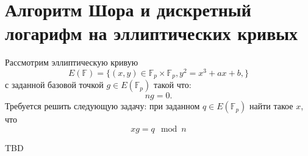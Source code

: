 \section{Алгоритм Шора и дискретный логарифм на эллиптических кривых} 
Рассмотрим эллиптическую кривую 
\[
E\left(\mathbb{F}\right) = \{
(x,y) \in \mathbb{F}_p \times \mathbb{F}_p, y^2 = x^3 +a x + b,
\}
\]
с заданной базовой точкой $g \in E\left(\mathbb{F}_p\right)$ такой что: 
\[
n g = 0.
\]
Требуется решить следующую задачу: при заданном $q
\in E\left(\mathbb{F}_p\right)$ найти такое $x$, что
\[
x g = q \mod n
\]

TBD
